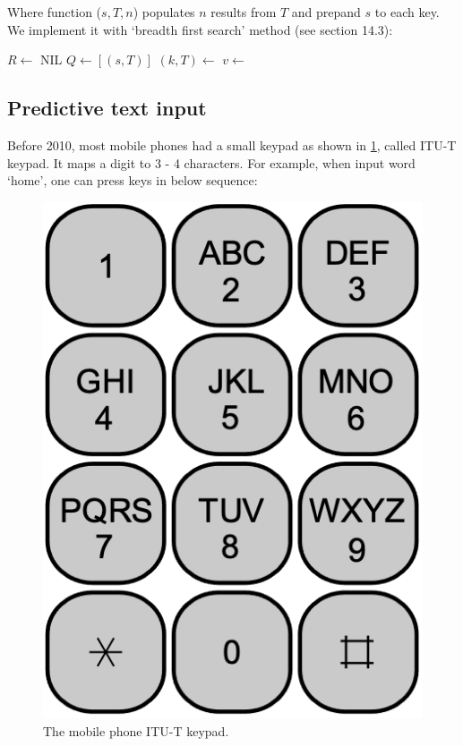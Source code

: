 \documentclass[b5paper]{article}
\begin{document}
Where function ($s, T, n$) populates $n$ results from $T$ and prepand $s$ to each key. We implement it with `breadth first search' method (see section 14.3):

\begin{algorithmic}[1]
  \State $R \gets $ NIL
  \State $Q \gets [(s, T)]$
    \State $(k, T) \gets$ 
    \State $v \gets$ 
      \State {}
    \EndIf
      \State {}
    \EndFor
  \EndWhile
\EndFunction
\end{algorithmic}

\subsection{Predictive text input}

Before 2010, most mobile phones had a small keypad as shown in \ref{fig:itut-keypad}, called ITU-T keypad. It maps a digit to 3 - 4 characters. For example, when input word `home', one can press keys in below sequence:

\begin{figure}[htbp]
  \centering
  \includegraphics[scale=0.4]{img/itu-t}
  \caption{The mobile phone ITU-T keypad.}
  \label{fig:itut-keypad}
\end{figure}
\end{document}
